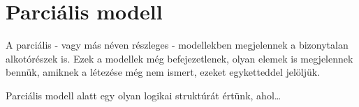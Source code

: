 \section{Parciális modell}

A parciális - vagy más néven részleges - modellekben megjelennek a bizonytalan alkotórészek is.
Ezek a modellek még befejezetlenek, olyan elemek is megjelennek bennük, amiknek a létezése még nem ismert, ezeket egyketteddel jelöljük.

\begin{definition}
Parciális modell alatt egy olyan logikai struktúrát értünk, ahol\ldots
\end{definition}